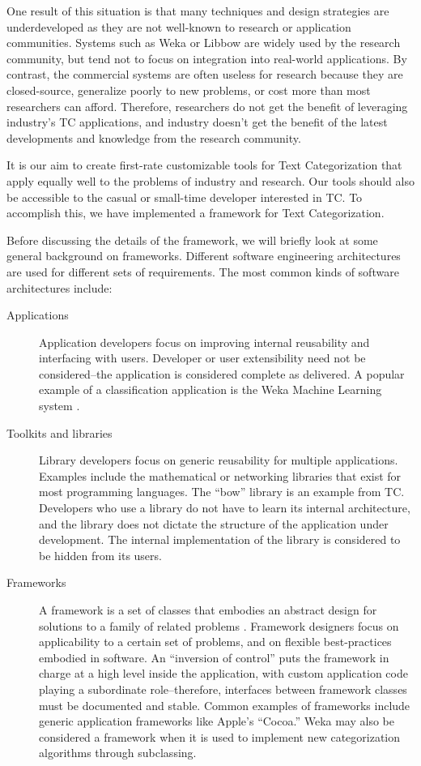\documentclass[twocolumn]{article}
\begin{document}
One result of this situation is that many techniques and
design strategies are underdeveloped as they are not well-known to research or
application communities.  Systems such as Weka \cite{weka:99} or
Libbow \cite{bow:96} are widely used by the research community, but
tend not to focus on integration into real-world applications.  By
contrast, the commercial systems are often useless for research
because they are closed-source, generalize poorly to new problems, or
cost more than most researchers can afford.  Therefore, researchers do
not get the benefit of leveraging industry's TC
applications, and industry doesn't get the benefit of the latest
developments and knowledge from the research community.

It is our aim to create first-rate customizable tools for Text
Categorization that apply equally well to the problems of industry and
research.  Our tools should also be accessible to the casual or
small-time developer interested in TC.  To accomplish this, we have
implemented a framework for Text Categorization.

Before discussing the details of the framework, we will briefly look at some general
background on frameworks.  Different software engineering
architectures are used for different sets of requirements.  The most
common kinds of software architectures include:


\begin{description}
\item[Applications] Application developers focus on improving internal
reusability and interfacing with users.  Developer or user
extensibility need not be considered--the application is considered
complete as delivered.  A popular example of a classification
application is the Weka Machine Learning system \cite{weka:99}.

\item[Toolkits and libraries] Library developers focus on generic
reusability for multiple applications.  Examples include the
mathematical or networking libraries that exist for most programming
languages.  The ``bow'' library \cite{bow:96} is an example from TC.
Developers who use a library do not have to learn its internal
architecture, and the library does not dictate the structure of the
application under development.\cite{fayad:99} The internal
implementation of the library is considered to be hidden from its
users.

\item[Frameworks] A framework is a set of classes that embodies an
abstract design for solutions to a family of related problems
\cite[Ch. 2]{fayad:99}.  Framework designers focus on applicability to
a certain set of problems, and on flexible best-practices embodied in
software.  An ``inversion of control'' puts the framework in charge at
a high level inside the application, with custom application code
playing a subordinate role--therefore, interfaces between framework
classes must be documented and stable.  Common examples of frameworks include
generic application frameworks like Apple's ``Cocoa.''  Weka may also
be considered a framework when it is used to implement new
categorization algorithms through subclassing.
\end{description}
\end{document}
